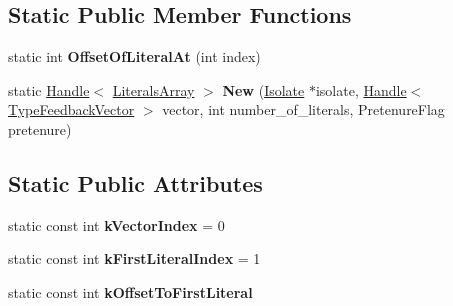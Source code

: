 \subsection*{Static Public Member Functions}
\begin{DoxyCompactItemize}
\item 
static int {\bfseries Offset\+Of\+Literal\+At} (int index)\hypertarget{classv8_1_1internal_1_1_literals_array_a21c4fa0b6d453214c0f0df342df092ec}{}\label{classv8_1_1internal_1_1_literals_array_a21c4fa0b6d453214c0f0df342df092ec}

\item 
static \hyperlink{classv8_1_1internal_1_1_handle}{Handle}$<$ \hyperlink{classv8_1_1internal_1_1_literals_array}{Literals\+Array} $>$ {\bfseries New} (\hyperlink{classv8_1_1internal_1_1_isolate}{Isolate} $\ast$isolate, \hyperlink{classv8_1_1internal_1_1_handle}{Handle}$<$ \hyperlink{classv8_1_1internal_1_1_type_feedback_vector}{Type\+Feedback\+Vector} $>$ vector, int number\+\_\+of\+\_\+literals, Pretenure\+Flag pretenure)\hypertarget{classv8_1_1internal_1_1_literals_array_a07979785f79c413f8b5fbbbde71f1372}{}\label{classv8_1_1internal_1_1_literals_array_a07979785f79c413f8b5fbbbde71f1372}

\end{DoxyCompactItemize}
\subsection*{Static Public Attributes}
\begin{DoxyCompactItemize}
\item 
static const int {\bfseries k\+Vector\+Index} = 0\hypertarget{classv8_1_1internal_1_1_literals_array_ab66078af612a57c9f6bc9b86f49b616f}{}\label{classv8_1_1internal_1_1_literals_array_ab66078af612a57c9f6bc9b86f49b616f}

\item 
static const int {\bfseries k\+First\+Literal\+Index} = 1\hypertarget{classv8_1_1internal_1_1_literals_array_adb4c0bad489d5ca9db396e13232bd994}{}\label{classv8_1_1internal_1_1_literals_array_adb4c0bad489d5ca9db396e13232bd994}

\item 
static const int {\bfseries k\+Offset\+To\+First\+Literal}
\end{DoxyCompactItemize}
